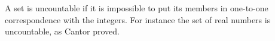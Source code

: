 A set is uncountable if it is impossible to put its members
in one-to-one correspondence with the integers. For instance 
the set of real numbers is uncountable, as Cantor proved.